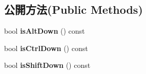 \subsection*{公開方法(Public Methods)}
\begin{DoxyCompactItemize}
\item 
bool {\bfseries is\+Alt\+Down} () const \hypertarget{class_magnum_1_1_input_1_1_touchpad_event_a15de9ab2c000f0b704e1fb18d5092e00}{}\label{class_magnum_1_1_input_1_1_touchpad_event_a15de9ab2c000f0b704e1fb18d5092e00}

\item 
bool {\bfseries is\+Ctrl\+Down} () const \hypertarget{class_magnum_1_1_input_1_1_touchpad_event_a6dbe81bace25ab61e2c6ceabd45f022c}{}\label{class_magnum_1_1_input_1_1_touchpad_event_a6dbe81bace25ab61e2c6ceabd45f022c}

\item 
bool {\bfseries is\+Shift\+Down} () const \hypertarget{class_magnum_1_1_input_1_1_touchpad_event_a1bbc5f7af2de31f320239c84de5ac55c}{}\label{class_magnum_1_1_input_1_1_touchpad_event_a1bbc5f7af2de31f320239c84de5ac55c}

\end{DoxyCompactItemize}
